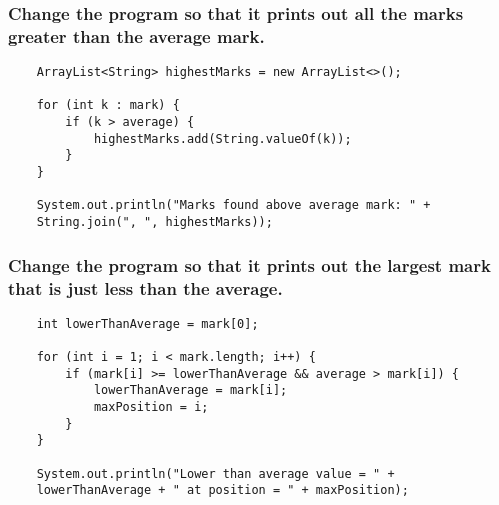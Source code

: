 \documentclass{article}
\begin{document}
    \newpage
    \subsubsection{Change the program so that it prints out all the marks greater than the average mark.}

    \begin{verbatim}
    ArrayList<String> highestMarks = new ArrayList<>();

    for (int k : mark) {
        if (k > average) {
            highestMarks.add(String.valueOf(k));
        }
    }

    System.out.println("Marks found above average mark: " + 
    String.join(", ", highestMarks));
    \end{verbatim}

    \subsubsection{Change the program so that it prints out the largest mark that is just less than the average.}

    \begin{verbatim}
    int lowerThanAverage = mark[0];

    for (int i = 1; i < mark.length; i++) {
        if (mark[i] >= lowerThanAverage && average > mark[i]) {
            lowerThanAverage = mark[i];
            maxPosition = i;
        }
    }

    System.out.println("Lower than average value = " + 
    lowerThanAverage + " at position = " + maxPosition);
    \end{verbatim}
\end{document}
